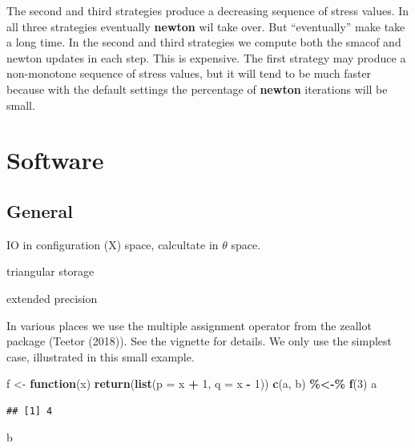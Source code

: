 \documentclass[
  12pt,
]{article}
\newenvironment{Shaded}{\begin{snugshade}}{\end{snugshade}}
\newcommand{\AttributeTok}[1]{\textcolor[rgb]{0.13,0.29,0.53}{#1}}
\newcommand{\ControlFlowTok}[1]{\textcolor[rgb]{0.13,0.29,0.53}{\textbf{#1}}}
\newcommand{\DecValTok}[1]{\textcolor[rgb]{0.00,0.00,0.81}{#1}}
\newcommand{\FunctionTok}[1]{\textcolor[rgb]{0.13,0.29,0.53}{\textbf{#1}}}
\newcommand{\NormalTok}[1]{#1}
\newcommand{\OtherTok}[1]{\textcolor[rgb]{0.56,0.35,0.01}{#1}}
\newcommand{\SpecialCharTok}[1]{\textcolor[rgb]{0.81,0.36,0.00}{\textbf{#1}}}
\begin{document}
The second and third strategies produce a decreasing sequence of stress values.
In all three strategies eventually \textbf{newton} wil take over. But ``eventually''
make take a long time. In the second and third strategies we compute both
the smacof and newton updates in each step. This is expensive. The first strategy
may produce a non-monotone sequence of stress values, but it will tend to
be much faster because with the default settings the percentage of \textbf{newton}
iterations will be small.

\section{Software}\label{software}

\subsection{General}\label{general}

IO in configuration (X) space, calcultate in \(\theta\) space.

triangular storage

extended precision

In various places we use the multiple assignment operator from the
zeallot package (Teetor (2018)). See the vignette for details. We only use
the simplest case, illustrated in this small example.

\begin{Shaded}
\begin{Highlighting}[]
\NormalTok{f }\OtherTok{\textless{}{-}} \ControlFlowTok{function}\NormalTok{(x) }\FunctionTok{return}\NormalTok{(}\FunctionTok{list}\NormalTok{(}\AttributeTok{p =}\NormalTok{ x }\SpecialCharTok{+} \DecValTok{1}\NormalTok{, }\AttributeTok{q =}\NormalTok{ x }\SpecialCharTok{{-}} \DecValTok{1}\NormalTok{))}
\FunctionTok{c}\NormalTok{(a, b) }\SpecialCharTok{\%\textless{}{-}\%} \FunctionTok{f}\NormalTok{(}\DecValTok{3}\NormalTok{)}
\NormalTok{a}
\end{Highlighting}
\end{Shaded}

\begin{verbatim}
## [1] 4
\end{verbatim}

\begin{Shaded}
\begin{Highlighting}[]
\NormalTok{b}
\end{Highlighting}
\end{Shaded}
\end{document}
